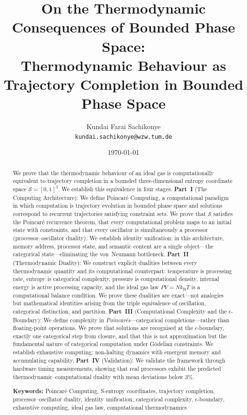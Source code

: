 \documentclass[twocolumn,10pt,a4paper]{article}
\title{\textbf{On the Thermodynamic Consequences of Bounded Phase Space:\\Thermodynamic Behaviour as Trajectory Completion in Bounded Phase Space}}
\author{
Kundai Farai Sachikonye\\
\texttt{kundai.sachikonye@wzw.tum.de}
}
\date{\today}
\theoremstyle{plain}
\theoremstyle{definition}
\theoremstyle{remark}
\newcommand{\kB}{k_{\mathrm{B}}}
\newcommand{\Sspace}{\mathcal{S}}
\begin{document}
\maketitle

\begin{abstract}
\noindent We prove that the thermodynamic behaviour of an ideal gas is computationally equivalent to trajectory completion in a bounded three-dimensional entropy coordinate space $\Sspace = [0,1]^3$. We establish this equivalence in four stages. \textbf{Part~I} (The Computing Architecture): We define Poincar\'{e} Computing, a computational paradigm in which computation is trajectory evolution in bounded phase space and solutions correspond to recurrent trajectories satisfying constraint sets. We prove that $\Sspace$ satisfies the Poincar\'{e} recurrence theorem, that every computational problem maps to an initial state with constraints, and that every oscillator is simultaneously a processor (processor--oscillator duality). We establish identity unification: in this architecture, memory address, processor state, and semantic content are a single object---the categorical state---eliminating the von~Neumann bottleneck. \textbf{Part~II} (Thermodynamic Duality): We construct explicit dualities between every thermodynamic quantity and its computational counterpart: temperature is processing rate, entropy is categorical complexity, pressure is computational density, internal energy is active processing capacity, and the ideal gas law $PV = N\kB T$ is a computational balance condition. We prove these dualities are exact---not analogies but mathematical identities arising from the triple equivalence of oscillation, categorical distinction, and partition. \textbf{Part~III} (Computational Complexity and the $\epsilon$-Boundary): We define complexity in \emph{Poincar\'{e}s}---categorical completions---rather than floating-point operations. We prove that solutions are recognised at the $\epsilon$-boundary, exactly one categorical step from closure, and that this is not approximation but the fundamental nature of categorical computation under G\"{o}delian constraints. We establish exhaustive computing: non-halting dynamics with emergent memory and accumulating capability. \textbf{Part~IV} (Validation): We validate the framework through hardware timing measurements, showing that real processors exhibit the predicted thermodynamic--computational duality with mean deviations below 3\%.

\medskip
\noindent\textbf{Keywords:} Poincar\'{e} Computing, S-entropy coordinates, trajectory completion, processor--oscillator duality, identity unification, categorical complexity, $\epsilon$-boundary, exhaustive computing, ideal gas law, computational thermodynamics
\end{abstract}
\end{document}
